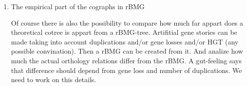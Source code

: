 \documentclass[11pt]{article}
\begin{document}
\begin{enumerate}
\item The empirical part of the cographs in rBMG 

Of course there is also the possibility to compare how much far appart does a theoretical cotree is appart from a rBMG-tree. Artifitial gene stories can be made taking into account duplications and/or gene losses and/or HGT (any possible convination).  Then a rBMG can be created from it. And analize how much the actual orthology relations differ from the rBMG. A gut-feeling says that difference should depend from gene loss and number of duplications. We need to work on this details.


\end{enumerate}


% 
\end{document}

